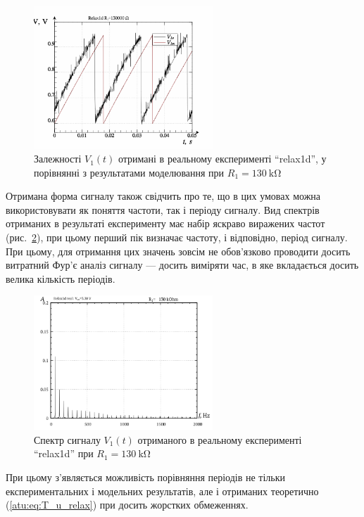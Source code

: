 \begin{figure}[htb!]
  \centerline{\includegraphics[width=0.6\textwidth]{p/relax1d_read_cmp-p_t_r1=130k.png} }
  \caption{Залежності $V_1(t)$ отримані в реальному експерименті ``relax1d'', у порівнянні з результатами моделювання при $ R_1 = \SI{130}{\kilo \ohm} $}
\label{atu:f:relax1d_read_cmp-p_t_r1}
\end{figure}

Отримана форма сигналу також свідчить про те, що в цих умовах
можна використовувати як поняття частоти, так і періоду
сигналу. Вид спектрів отриманих в результаті експерименту має
набір яскраво виражених частот (рис.~\ref{atu:f:relax1d_f_r1}), при
цьому перший пік визначає частоту, і відповідно, період
сигналу. При цьому, для отримання цих значень зовсім не
обов'язково проводити досить витратний Фур'є аналіз сигналу ---
досить виміряти час, в яке вкладається досить велика кількість
періодів.

\begin{figure}[htb!]
  \centerline{\includegraphics[width=0.6\textwidth]{p/relax1d_f_r1=130k.png} }
\caption{Спектр сигналу $ V_1 (t) $ отриманого в реальному експерименті ``relax1d'' при $ R_1 = \SI{130}{\kilo \ohm} $}
  \label{atu:f:relax1d_f_r1}
\end{figure}

При цьому з'являється можливість порівняння періодів не тільки
експериментальних і модельних результатів, але і отриманих
теоретично (\ref{atu:eq:T_u_relax}) при досить жорстких обмеженнях.


